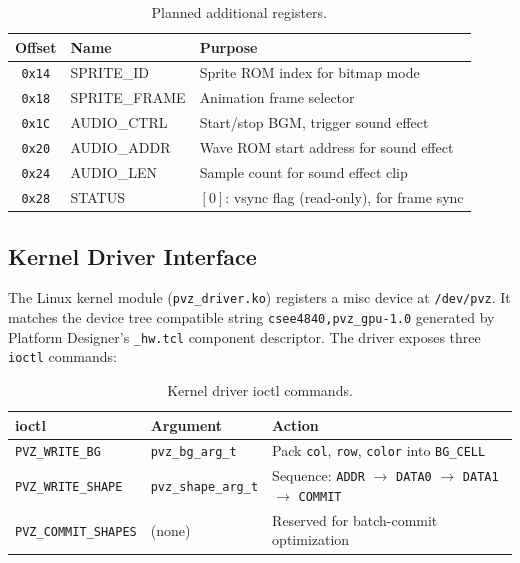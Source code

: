 \documentclass[11pt,letterpaper]{article}
\begin{document}
\begin{table}[H]
\centering
\caption{Planned additional registers.}
\label{tab:planned-regs}
\begin{tabular}{c l l}
\toprule
\textbf{Offset} & \textbf{Name} & \textbf{Purpose} \\
\midrule
\texttt{0x14} & SPRITE\_ID     & Sprite ROM index for bitmap mode \\
\texttt{0x18} & SPRITE\_FRAME  & Animation frame selector \\
\texttt{0x1C} & AUDIO\_CTRL    & Start/stop BGM, trigger sound effect \\
\texttt{0x20} & AUDIO\_ADDR    & Wave ROM start address for sound effect \\
\texttt{0x24} & AUDIO\_LEN     & Sample count for sound effect clip \\
\texttt{0x28} & STATUS         & $[0]$: vsync flag (read-only), for frame sync \\
\bottomrule
\end{tabular}
\end{table}

\subsection{Kernel Driver Interface}
\label{sec:driver}

The Linux kernel module (\texttt{pvz\_driver.ko}) registers a misc
device at \texttt{/dev/pvz}. It matches the device tree compatible
string \texttt{csee4840,pvz\_gpu-1.0} generated by Platform Designer's
\texttt{\_hw.tcl} component descriptor. The driver exposes three
\texttt{ioctl} commands:

\begin{table}[H]
\centering
\caption{Kernel driver ioctl commands.}
\label{tab:ioctls}
\begin{tabular}{l l l}
\toprule
\textbf{ioctl} & \textbf{Argument} & \textbf{Action} \\
\midrule
\texttt{PVZ\_WRITE\_BG}
  & \texttt{pvz\_bg\_arg\_t}
  & Pack \texttt{col}, \texttt{row}, \texttt{color} into \texttt{BG\_CELL} \\
\texttt{PVZ\_WRITE\_SHAPE}
  & \texttt{pvz\_shape\_arg\_t}
  & Sequence: \texttt{ADDR} $\to$ \texttt{DATA0} $\to$ \texttt{DATA1} $\to$ \texttt{COMMIT} \\
\texttt{PVZ\_COMMIT\_SHAPES}
  & (none)
  & Reserved for batch-commit optimization \\
\bottomrule
\end{tabular}
\end{table}
\end{document}
